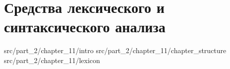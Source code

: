 \chapter{Средства лексического и синтаксического анализа}

 {src/part_2/chapter_11/intro}
 {src/part_2/chapter_11/chapter_structure}
 {src/part_2/chapter_11/lexicon}

